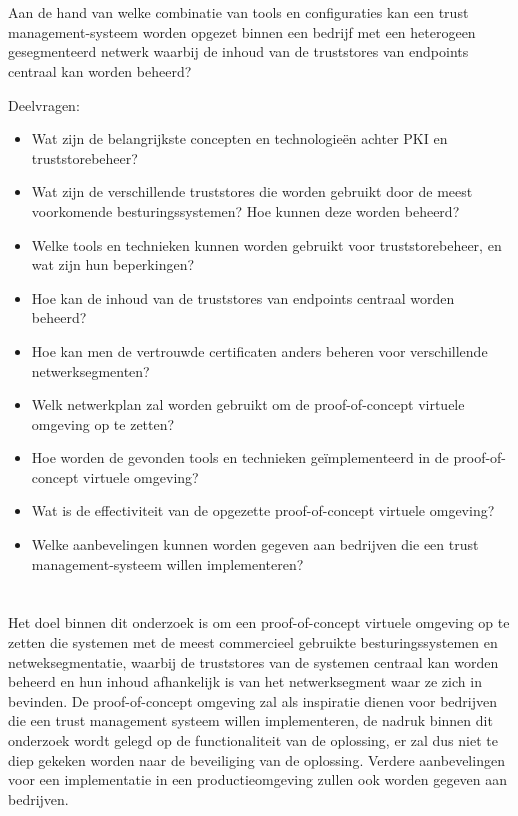 \section{}%
\label{sec:onderzoeksvraag}

Aan de hand van welke combinatie van tools en configuraties kan een trust management-systeem worden opgezet binnen een bedrijf met een heterogeen gesegmenteerd netwerk waarbij de inhoud van de truststores van endpoints centraal kan worden beheerd?

Deelvragen:
\begin{itemize}
    \item Wat zijn de belangrijkste concepten en technologieën achter PKI en truststorebeheer? 
    \item Wat zijn de verschillende truststores die worden gebruikt door de meest voorkomende besturingssystemen? Hoe kunnen deze worden beheerd?
    \item Welke tools en technieken kunnen worden gebruikt voor truststorebeheer, en wat zijn hun beperkingen? 
    \item Hoe kan de inhoud van de truststores van endpoints centraal worden beheerd?
    \item Hoe kan men de vertrouwde certificaten anders beheren voor verschillende netwerksegmenten?
    \item Welk netwerkplan zal worden gebruikt om de proof-of-concept virtuele omgeving op te zetten?
    \item Hoe worden de gevonden tools en technieken geïmplementeerd in de proof-of-concept virtuele omgeving?
    \item Wat is de effectiviteit van de opgezette proof-of-concept virtuele omgeving?
    \item Welke aanbevelingen kunnen worden gegeven aan bedrijven die een trust management-systeem willen implementeren?
\end{itemize}

\section{}%
\label{sec:onderzoeksdoelstelling}

Het doel binnen dit onderzoek is om een proof-of-concept virtuele omgeving op te zetten die systemen met de meest commercieel gebruikte besturingssystemen en netweksegmentatie, waarbij de truststores van de systemen centraal kan worden beheerd en hun inhoud afhankelijk is van het netwerksegment waar ze zich in bevinden.
De proof-of-concept omgeving zal als inspiratie dienen voor bedrijven die een trust management systeem willen implementeren, de nadruk binnen dit onderzoek wordt gelegd op de functionaliteit van de oplossing, er zal dus niet te diep gekeken worden naar de beveiliging van de oplossing.
Verdere aanbevelingen voor een implementatie in een productieomgeving zullen ook worden gegeven aan bedrijven.

